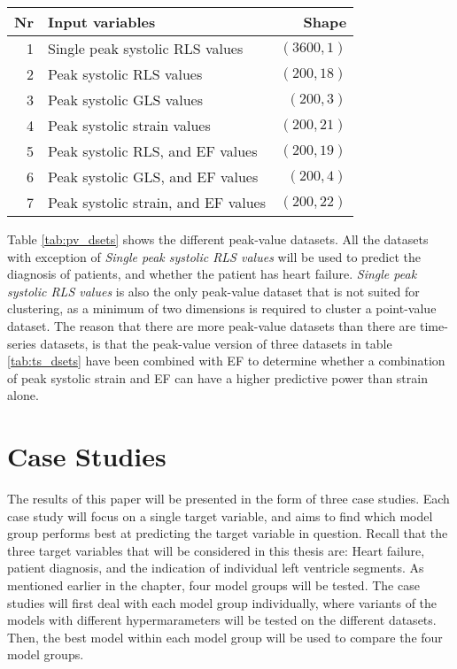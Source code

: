 \begin{table*}[h]
    \centering
    \begin{tabular}{ rlr }
        \toprule
        Nr & Input variables                     & Shape \\
        \midrule                              
        1  & Single peak systolic RLS values     & $(3600,1)$ \\
        2  & Peak systolic RLS values            & $(200,18)$ \\
        3  & Peak systolic GLS values            & $(200,3)$  \\
        4  & Peak systolic strain values         & $(200,21)$ \\
        5  & Peak systolic RLS, and EF values    & $(200,19)$ \\
        6  & Peak systolic GLS, and EF values    & $(200,4)$  \\
        7  & Peak systolic strain, and EF values & $(200,22)$ \\
        \bottomrule
    \end{tabular}
    \caption{Peak-value datasets. The ''Shape'' parameter is indicates: (Number of objects in the dataset, Number of dimensions of each individual object).}
    \label{tab:pv_dsets}
\end{table*}

Table \ref{tab:pv_dsets} shows the different peak-value datasets. 
All the datasets with exception of \textit{Single peak systolic RLS values} will be used to predict the diagnosis of patients, and whether the patient has heart failure. 
\textit{Single peak systolic RLS values} is also the only peak-value dataset that is not suited for clustering, as a minimum of two dimensions is required to cluster a point-value dataset.
The reason that there are more peak-value datasets than there are time-series datasets, is that the peak-value version of three datasets in table \ref{tab:ts_dsets} have been combined 
with EF to determine whether a combination of peak systolic strain and EF can have a higher predictive power than strain alone.

\section{Case Studies}
The results of this paper will be presented in the form of three case studies. 
Each case study will focus on a single target variable, and aims to find which model group performs best at predicting the target variable in question.
Recall that the three target variables that will be considered in this thesis are: Heart failure, patient diagnosis, and the indication of individual left ventricle segments.
As mentioned earlier in the chapter, four model groups will be tested. 
The case studies will first deal with each model group individually, where variants of the models with different hypermarameters will be tested on the different datasets. 
Then, the best model within each model group will be used to compare the four model groups.

